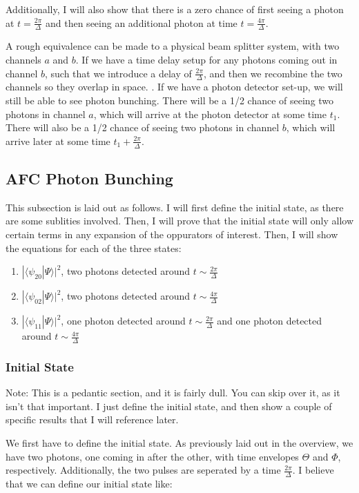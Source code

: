 \documentclass[12pt]{article}
\begin{document}
Additionally, I will also show that there is a zero chance of first seeing a photon at $t = \frac{2 \pi}{\Delta}$ and then seeing an additional photon at time $t = \frac{4 \pi}{\Delta}$.

A rough equivalence can be made to a physical beam splitter system, with two channels $a$ and $b$. If we have a time delay setup for any photons coming out in channel $b$, such that we introduce a delay of $\frac{2 \pi}{\Delta}$, and then
we recombine the two channels so they overlap in space.
. If we have a photon detector set-up, we will still be able to see photon bunching. There will be a 1/2 chance of seeing two photons in channel $a$, which will arrive at the photon detector at some time $t_1$. There will also be a 1/2 chance of seeing two photons in channel $b$, which will arrive later at some time $t_1+\frac{2 \pi}{\Delta}$. 
\subsection{AFC Photon Bunching}
This subsection is laid out as follows. I will first define the initial state, as there are some sublities involved. Then, I will prove that the initial state will only allow certain terms in any expansion of the oppurators of interest. Then, I will show the equations for each of the three states:
\begin{enumerate}
\item  $|\langle \psi_{20} | \Psi \rangle |^2$, two photons detected around $t\sim\frac{2\pi}{\Delta}$
\item $ | \langle \psi_{02} | \Psi \rangle |^2 $, two photons detected around $t \sim\frac{4 \pi}{\Delta}$
\item $ | \langle \psi_{11} |\Psi \rangle |^2 $, one photon detected around $t\sim\frac{2\pi}{\Delta}$ and one photon 
detected around $t\sim\frac{4\pi}{\Delta}$
\end{enumerate}
\subsubsection{Initial State}
Note: This is a pedantic section, and it is fairly dull. You can skip over it, as it isn't that important. I just define the initial state, and then show a couple of specific results that I will reference later.

We first have to define the initial state. As previously laid out in the overview, we have two photons, one coming in
after the other, with time envelopes $\Theta$ and $\Phi$, respectively. Additionally, the two pulses are seperated by a time $\frac{2 \pi}{\Delta}$. I believe that we can define our initial state like:
\end{document}
